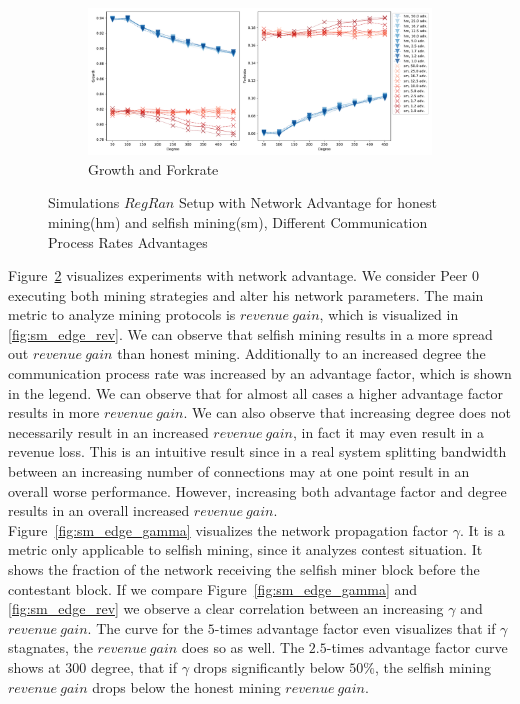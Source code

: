 \begin{figure}[tbp]
\ContinuedFloat
\begin{subfigure}[b]{\textwidth}
		\includegraphics[width=\textwidth]{figures/sm_edge_new_growth_and_forkrate.pdf}
		\caption{Growth and Forkrate}
		\label{fig:growth_fork}
	\end{subfigure}
\caption{Simulations $RegRan$ Setup with Network Advantage for honest mining(hm) and selfish mining(sm), Different Communication Process Rates Advantages}
	\label{fig:sm_edge_new}

\end{figure}
Figure~\ref{fig:sm_edge_new} visualizes experiments with network advantage. We consider Peer $0$ executing both mining strategies and alter his network parameters. The main metric to analyze mining protocols is $revenue~gain$, which is visualized in \ref{fig:sm_edge_rev}. We can observe that selfish mining results in a more spread out $revenue~gain$ than honest mining. Additionally to an increased degree the communication process rate was increased by an advantage factor, which is shown in the legend. We can observe that for almost all cases a higher advantage factor results in more $revenue~gain$. We can also observe that increasing degree does not necessarily result in an increased $revenue~gain$, in fact it may even result in a revenue loss. This is an intuitive result since in a real system splitting bandwidth between an increasing number of connections may at one point result in an overall worse performance. However, increasing both advantage factor and degree results in an overall increased $revenue~gain$.\\
Figure~\ref{fig:sm_edge_gamma} visualizes the network propagation factor $\gamma$. It is a metric only applicable to selfish mining, since it analyzes contest situation. It shows the fraction of the network receiving the selfish miner block before the contestant block. If we compare Figure~\ref{fig:sm_edge_gamma} and \ref{fig:sm_edge_rev} we observe a clear correlation between an increasing $\gamma$ and $revenue~gain$. The curve for the $5$-times advantage factor even visualizes that if $\gamma$ stagnates, the $revenue~gain$ does so as well. The $2.5$-times advantage factor curve shows at $300$ degree, that if $\gamma$ drops significantly below $50\% $, the selfish mining $revenue~gain$ drops below the honest mining $revenue~gain$.\\
